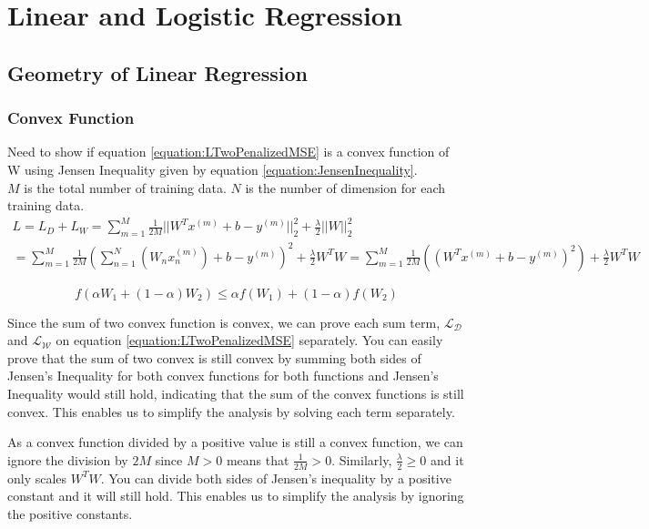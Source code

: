 \documentclass[a4paper,12pt]{article}
\begin{document}
\section{Linear and Logistic Regression}
\subsection{Geometry of Linear Regression}
\subsubsection{Convex Function}
Need to show if equation \ref{equation:LTwoPenalizedMSE} is a convex function of W using Jensen Inequality given by equation 
\ref{equation:JensenInequality}. \\



$M$ is the total number of training data. 
$N$ is the number of dimension for each training data. 
\begin{equation}
\label{equation:LTwoPenalizedMSE}
\begin{split}
L = L_{D} + L_{W} = \sum_{m=1}^{M} \frac{1}{2M} ||W^{T}x^{(m)} + b - y^{(m)}||_{2}^{2} + \frac{\lambda}{2} ||W||_{2}^{2} \\
= \sum_{m=1}^{M} \frac{1}{2M} (\sum_{n=1}^{N}(W_{n}x^{(m)}_{n}) + b - y^{(m)})^{2} + \frac{\lambda}{2} W^{T}W = \sum_{m=1}^{M} \frac{1}{2M} ((W^{T}x^{(m)} + b - y^{(m)})^{2}) + \frac{\lambda}{2} W^{T}W 
\end{split}
\end{equation}

\begin{equation}
\label{equation:JensenInequality}
f(\alpha W_{1} + (1-\alpha)W_{2}) \leq \alpha f(W_{1}) + (1-\alpha)f(W_{2})
\end{equation}

Since the sum of two convex function is convex, we can prove each sum term, $\mathcal{L_D}$ and $\mathcal{L_W}$ on equation \ref{equation:LTwoPenalizedMSE} separately. You can easily prove that the sum of two convex is still convex by summing both sides of Jensen's Inequality for both convex functions for both functions and Jensen's Inequality would still hold, indicating that the sum of the convex functions is still convex. This enables us to simplify the analysis by solving each term separately. 

As a convex function divided by a positive value is still a convex function, we can ignore the division by $2M$ since $M > 0$ means that $\frac{1}{2M} > 0$. Similarly, $\frac{\lambda}{2} \geq 0$ and it only scales $W^{T}W$. You can divide both sides of Jensen's inequality by a positive constant and it will still hold. This enables us to simplify the analysis by ignoring the positive constants. 
\end{document}
